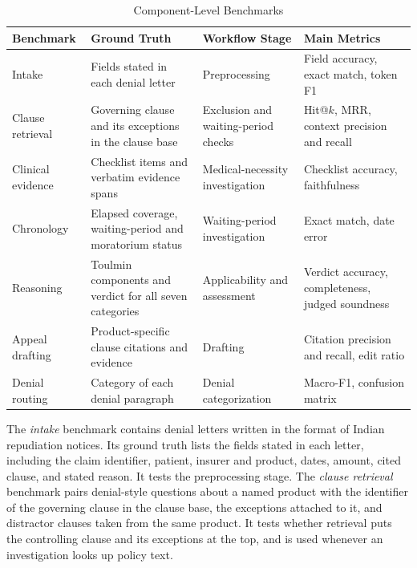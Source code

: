 \documentclass[conference]{IEEEtran}
\begin{document}
\begin{table}[!t]
\centering
\caption{Component-Level Benchmarks}
\label{tab:benchmarks}
\scriptsize
\setlength{\tabcolsep}{3pt}
\renewcommand{\arraystretch}{1.15}
\begin{tabularx}{\columnwidth}{|P{1.45cm}|Y|P{1.55cm}|P{1.75cm}|}
\hline
\textbf{Benchmark} & \textbf{Ground Truth} & \textbf{Workflow Stage} & \textbf{Main Metrics} \\
\hline
Intake & Fields stated in each denial letter & Preprocessing & Field accuracy, exact match, token F1 \\
\hline
Clause retrieval & Governing clause and its exceptions in the clause base & Exclusion and waiting-period checks & Hit@$k$, MRR, context precision and recall \\
\hline
Clinical evidence & Checklist items and verbatim evidence spans & Medical-necessity investigation & Checklist accuracy, faithfulness \\
\hline
Chronology & Elapsed coverage, waiting-period and moratorium status & Waiting-period investigation & Exact match, date error \\
\hline
Reasoning & Toulmin components and verdict for all seven categories & Applicability and assessment & Verdict accuracy, completeness, judged soundness \\
\hline
Appeal drafting & Product-specific clause citations and evidence & Drafting & Citation precision and recall, edit ratio \\
\hline
Denial routing & Category of each denial paragraph & Denial categorization & Macro-F1, confusion matrix \\
\hline
\end{tabularx}
\end{table}

The \emph{intake} benchmark contains denial letters written in the format of Indian repudiation notices. Its ground truth lists the fields stated in each letter, including the claim identifier, patient, insurer and product, dates, amount, cited clause, and stated reason. It tests the preprocessing stage. The \emph{clause retrieval} benchmark pairs denial-style questions about a named product with the identifier of the governing clause in the clause base, the exceptions attached to it, and distractor clauses taken from the same product. It tests whether retrieval puts the controlling clause and its exceptions at the top, and is used whenever an investigation looks up policy text.
\end{document}
